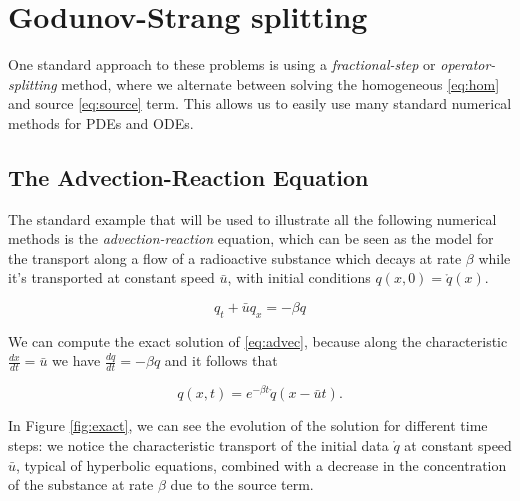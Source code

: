 \documentclass[journal,onecolumn]{IEEEtran}
\begin{document}




\section{Godunov-Strang splitting}

One standard approach to these problems is using a \textit{fractional-step} or \textit{operator-splitting} method, where we alternate between solving the homogeneous \eqref{eq:hom} and source \eqref{eq:source} term. This allows us to easily use many standard numerical methods for PDEs and ODEs.

\subsection{The Advection-Reaction Equation}

The standard example that will be used to illustrate all the following numerical methods is the \textit{advection-reaction} equation, which can be seen as the model for the transport along a flow of a radioactive substance which decays at rate $\beta$ while it's transported at constant speed $\bar{u}$, with initial conditions $q(x,0)= \mathring{q}(x)$.

\begin{equation}\label{eq:advec}
	q_t + \bar{u}q_x=-\beta q
\end{equation}

We can compute the exact solution of \eqref{eq:advec}, because along the characteristic $\frac{dx}{dt}=\bar{u}$ we have $\frac{dq}{dt}=-\beta q$ and it follows that

\begin{equation}\label{eq:advec_sol}
	q(x,t) = e^{-\beta t}\mathring{q}(x-\bar{u}t).
\end{equation}

In Figure \ref{fig:exact}, we can see the evolution of the solution for different time steps: we notice the characteristic transport of the initial data $\mathring{q}$ at constant speed $\bar{u}$, typical of hyperbolic equations, combined with a decrease in the concentration of the substance at rate $\beta$ due to the source term.
\end{document}
